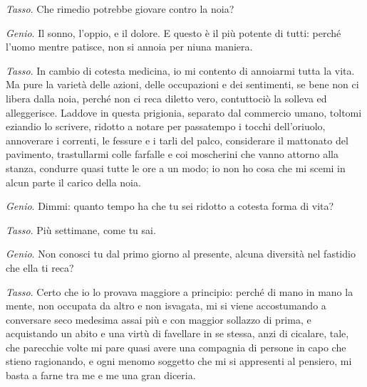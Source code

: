 \emph{Tasso}. Che rimedio potrebbe giovare contro la noia?

\emph{Genio}. Il sonno, l'oppio, e il dolore. E questo è il più potente di tutti: perché l'uomo mentre patisce, non si annoia per niuna maniera.

\emph{Tasso}. In cambio di cotesta medicina, io mi contento di annoiarmi tutta la vita. Ma pure la varietà delle azioni, delle occupazioni e dei sentimenti, se bene non ci libera dalla noia, perché non ci reca diletto vero, contuttociò la solleva ed alleggerisce. Laddove in questa prigionia, separato dal commercio umano, toltomi eziandio lo scrivere, ridotto a notare per passatempo i tocchi dell'oriuolo, annoverare i correnti, le fessure e i tarli del palco, considerare il mattonato del pavimento, trastullarmi colle farfalle e coi moscherini che vanno attorno alla stanza, condurre quasi tutte le ore a un modo; io non ho cosa che mi scemi in alcun parte il carico della noia.

\emph{Genio}. Dimmi: quanto tempo ha che tu sei ridotto a cotesta forma di vita?

\emph{Tasso}. Più settimane, come tu sai.

\emph{Genio}. Non conosci tu dal primo giorno al presente, alcuna diversità nel fastidio che ella ti reca?

\emph{Tasso}. Certo che io lo provava maggiore a principio: perché di mano in mano la mente, non occupata da altro e non isvagata, mi si viene accostumando a conversare seco medesima assai più e con maggior sollazzo di prima, e acquistando un abito e una virtù di favellare in se stessa, anzi di cicalare, tale, che parecchie volte mi pare quasi avere una compagnia di persone in capo che stieno ragionando, e ogni menomo soggetto che mi si appresenti al pensiero, mi basta a farne tra me e me una gran diceria.

